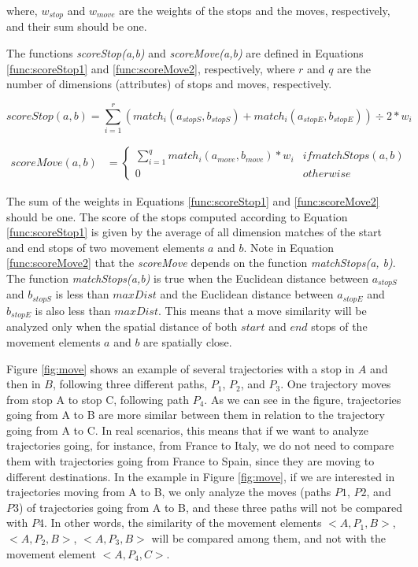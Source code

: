 \documentclass[12pt]{article}
\begin{document}
where, $w_{stop}$ and $w_{move}$ are the weights of the stops and the moves, respectively, and their sum should be one.

The functions \emph{scoreStop(a,b)} and \emph{scoreMove(a,b)} are defined in Equations \ref{func:scoreStop1} and \ref{func:scoreMove2}, respectively, where $r$ and $q$ are the number of dimensions (attributes) of stops and moves, respectively.


\begin{equation}
\label{func:scoreStop1}
  scoreStop(a, b) = \sum\limits_{i=1}^r (match_i(a_{stopS}, b_{stopS}) + match_i(a_{stopE}, b_{stopE}))\div 2* w_{i}
\end{equation}


\begin{equation}
\label{func:scoreMove2}
\begin{split}
scoreMove(a, b)  & = 
  \begin{cases} 
      \sum\limits_{i=1}^q match_i(a_{move}, b_{move}) * w_{i} & if matchStops(a, b)\\
      0 & otherwise
  \end{cases}
\end{split}
\end{equation}


The sum of the weights in Equations \ref{func:scoreStop1} and \ref{func:scoreMove2} should be one.
The score of the stops computed according to Equation \ref{func:scoreStop1} is given by the average of all dimension matches of the start and end stops of two movement elements $a$ and $b$. Note in Equation \ref{func:scoreMove2} that the \emph{scoreMove} depends on the function \textit{matchStops(a, b)}.
The function \emph{matchStops(a,b)} is true when the Euclidean distance between $a_{stopS}$ and $b_{stopS}$ is less than $maxDist$ and the Euclidean distance between $a_{stopE}$ and $b_{stopE}$ is also less than $maxDist$. This means that a move similarity will be analyzed only when the spatial distance of both $start$ and $end$ stops of the movement elements $a$ and $b$ are spatially close. 

Figure \ref{fig:move} shows an example of several trajectories with a stop in $A$ and then in  $B$, following three different paths, $P_1$, $P_2$, and $P_3$. One trajectory moves from stop A to stop C, following path $P_4$. As we can see in the figure, trajectories going from A to B are more similar between them in relation to the trajectory going from A to C.
In real scenarios, this means that if we want to analyze trajectories going, for instance, from France to Italy, we do not need to compare them with trajectories going from France to Spain, since they are moving to different destinations. In the example in Figure \ref{fig:move}, if we are interested in trajectories moving from A to B, we only analyze the moves (paths $P1$, $P2$, and $P3$) of trajectories going from A to B, and these three paths will not be compared with $P4$. In other words, the similarity of the movement elements $<A, P_1, B>$, $<A, P_2, B>$, $<A, P_3, B>$ will be compared among them, and not with the movement element $<A, P_4, C>$.
\end{document}

